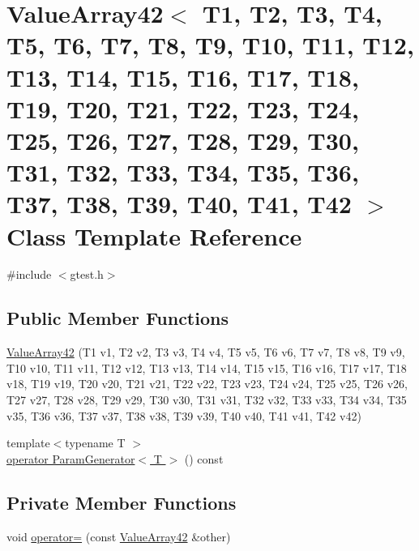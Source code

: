 \hypertarget{classtesting_1_1internal_1_1ValueArray42}{\section{\-Value\-Array42$<$ \-T1, \-T2, \-T3, \-T4, \-T5, \-T6, \-T7, \-T8, \-T9, \-T10, \-T11, \-T12, \-T13, \-T14, \-T15, \-T16, \-T17, \-T18, \-T19, \-T20, \-T21, \-T22, \-T23, \-T24, \-T25, \-T26, \-T27, \-T28, \-T29, \-T30, \-T31, \-T32, \-T33, \-T34, \-T35, \-T36, \-T37, \-T38, \-T39, \-T40, \-T41, \-T42 $>$ \-Class \-Template \-Reference}
\label{d0/dd6/classtesting_1_1internal_1_1ValueArray42}
}


{\ttfamily \#include $<$gtest.\-h$>$}

\subsection*{\-Public \-Member \-Functions}
\begin{DoxyCompactItemize}
\item 
\hyperlink{classtesting_1_1internal_1_1ValueArray42_a1e7858ec6982150c25418de1068be22d}{\-Value\-Array42} (\-T1 v1, \-T2 v2, \-T3 v3, \-T4 v4, \-T5 v5, \-T6 v6, \-T7 v7, \-T8 v8, \-T9 v9, \-T10 v10, \-T11 v11, \-T12 v12, \-T13 v13, \-T14 v14, \-T15 v15, \-T16 v16, \-T17 v17, \-T18 v18, \-T19 v19, \-T20 v20, \-T21 v21, \-T22 v22, \-T23 v23, \-T24 v24, \-T25 v25, \-T26 v26, \-T27 v27, \-T28 v28, \-T29 v29, \-T30 v30, \-T31 v31, \-T32 v32, \-T33 v33, \-T34 v34, \-T35 v35, \-T36 v36, \-T37 v37, \-T38 v38, \-T39 v39, \-T40 v40, \-T41 v41, \-T42 v42)
\item 
{\footnotesize template$<$typename T $>$ }\\\hyperlink{classtesting_1_1internal_1_1ValueArray42_a08ef46fa12c9dd8ef6fc630baeea89b7}{operator Param\-Generator$<$ T $>$} () const 
\end{DoxyCompactItemize}
\subsection*{\-Private \-Member \-Functions}
\begin{DoxyCompactItemize}
\item 
void \hyperlink{classtesting_1_1internal_1_1ValueArray42_ab811acb29f89f79d15e2690734f3857d}{operator=} (const \hyperlink{classtesting_1_1internal_1_1ValueArray42}{\-Value\-Array42} \&other)
\end{DoxyCompactItemize}
